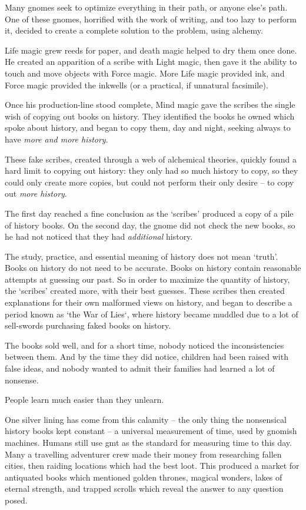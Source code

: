 \begin{multicols}{2}
\begin{exampletext}
  Many gnomes seek to optimize everything in their path, or anyone else's path.
  One of these gnomes, horrified with the work of writing, and too lazy to perform it, decided to create a complete solution to the problem, using alchemy.

  Life magic grew reeds for paper, and death magic helped to dry them once done.
  He created an apparition of a scribe with Light magic, then gave it the ability to touch and move objects with Force magic.
  More Life magic provided ink, and Force magic provided the inkwells (or a practical, if unnatural facsimile).

  Once his production-line stood complete, Mind magic gave the scribes the single wish of copying out books on history.
  They identified the books he owned which spoke about history, and began to copy them, day and night, seeking always to have \emph{more and more history}.

  These fake scribes, created through a web of alchemical theories, quickly found a hard limit to copying out history: they only had so much history to copy, so they could only create more copies, but could not perform their only desire -- to copy out \emph{more history}.

  The first day reached a fine conclusion as the `scribes' produced a copy of a pile of history books.
  On the second day, the gnome did not check the new books, so he had not noticed that they had \emph{additional} history.

  The study, practice, and essential meaning of history does not mean `truth'.
  Books on history do not need to be accurate.
  Books on history contain reasonable attempts at guessing our past.
  So in order to maximize the quantity of history, the `scribes' created more, with their best guesses.
  These scribes then created explanations for their own malformed views on history, and began to describe a period known as `the War of Lies`, where history became muddled due to a lot of sell-swords purchasing faked books on history.

  The books sold well, and for a short time, nobody noticed the inconsistencies between them.
  And by the time they did notice, children had been raised with false ideas, and nobody wanted to admit their families had learned a lot of nonsense.

  People learn much easier than they unlearn.

    One silver lining has come from this calamity -- the only thing the nonsensical history books kept constant -- a universal measurement of time, used by gnomish machines.
    Humans still use \gls{gmt} as the standard for measuring time to this day.
  \else
    Many a travelling adventurer crew made their money from researching fallen cities, then raiding locations which had the best loot.
    This produced a market for antiquated books which mentioned golden thrones, magical wonders, lakes of eternal strength, and trapped scrolls which reveal the answer to any question posed.


\end{exampletext}
\end{multicols}
